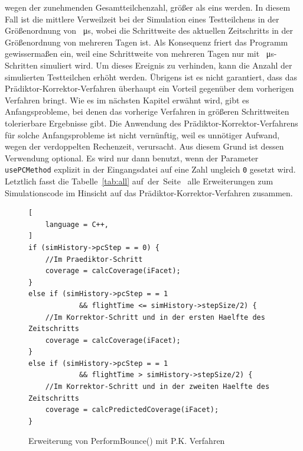 \documentclass{listhesis}
\begin{document}
wegen der zunehmenden Gesamtteilchenzahl, größer als eins werden. In diesem Fall ist die mittlere Verweilzeit bei der Simulation eines Testteilchens in der Größenordnung von \SI{}{\micro\s}, wobei die Schrittweite des aktuellen Zeitschritts in der Größenordnung von mehreren Tagen ist. Als Konsequenz friert das Programm gewissermaßen ein, weil eine Schrittweite von mehreren Tagen nur mit \SI{}{\micro\s}-Schritten simuliert wird. Um dieses Ereignis zu verhinden, kann die Anzahl der simulierten Testteilchen erhöht werden. Übrigens ist es nicht garantiert, dass das Prädiktor-Korrektor-Verfahren überhaupt ein Vorteil gegenüber dem vorherigen Verfahren bringt. Wie es im nächsten Kapitel erwähnt wird, gibt es Anfangsprobleme, bei denen das vorherige Verfahren in größeren Schrittweiten tolerierbare Ergebnisse gibt. Die Anwendung des Prädiktor-Korrektor-Verfahrens für solche Anfangsprobleme ist nicht vernünftig, weil es unnötiger Aufwand, wegen der verdoppelten Rechenzeit, verursacht. Aus diesem Grund ist dessen Verwendung optional. Es wird nur dann benutzt, wenn der Parameter \texttt{usePCMethod} explizit in der Eingangsdatei auf eine Zahl ungleich \texttt{0} gesetzt wird. Letztlich fasst die Tabelle~\ref{tab:all} auf~der~Seite~\pageref{tab:all} alle Erweiterungen zum Simulationscode im Hinsicht auf das Prädiktor-Korrektor-Verfahren zusammen.

\begin{figure}[!p]
\centering
\begin{lstlisting}[
    language = C++,
]
if (simHistory->pcStep = = 0) { 
	//Im Praediktor-Schritt
	coverage = calcCoverage(iFacet);
} 
else if (simHistory->pcStep = = 1 
		    && flightTime <= simHistory->stepSize/2) { 
	//Im Korrektor-Schritt und in der ersten Haelfte des Zeitschritts
	coverage = calcCoverage(iFacet);
} 
else if (simHistory->pcStep = = 1 
		    && flightTime > simHistory->stepSize/2) {
	//Im Korrektor-Schritt und in der zweiten Haelfte des Zeitschritts
	coverage = calcPredictedCoverage(iFacet);			
}
\end{lstlisting}
\caption{Erweiterung von PerformBounce() mit P.K. Verfahren}
\label{fig:performBounce}
\end{figure}
\end{document}
